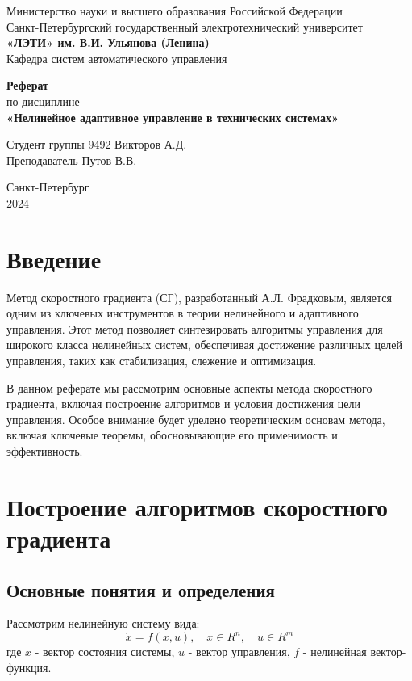 \documentclass[14pt,a4paper]{article}
\begin{document}
\begin{titlepage}
    \begin{center}
        \large
        Министерство науки и высшего образования Российской Федерации \\
        Санкт-Петербургский государственный электротехнический университет \\
        \textbf{«ЛЭТИ» им. В.И. Ульянова (Ленина)} \\
        Кафедра систем автоматического управления

        \vfill

        \textbf{Реферат} \\
        по дисциплине \\
        \textbf{«Нелинейное адаптивное управление в технических системах»}

        \vfill

        Студент группы 9492 \hfill Викторов А.Д. \\
        Преподаватель \hfill Путов В.В.

        \vfill
        Санкт-Петербург \\
        2024
    \end{center}
\end{titlepage}

\tableofcontents

\section{Введение}
Метод скоростного градиента (СГ), разработанный А.Л. Фрадковым, является одним из ключевых инструментов в теории нелинейного и адаптивного управления. Этот метод позволяет синтезировать алгоритмы управления для широкого класса нелинейных систем, обеспечивая достижение различных целей управления, таких как стабилизация, слежение и оптимизация.

В данном реферате мы рассмотрим основные аспекты метода скоростного градиента, включая построение алгоритмов и условия достижения цели управления. Особое внимание будет уделено теоретическим основам метода, включая ключевые теоремы, обосновывающие его применимость и эффективность.

\section{Построение алгоритмов скоростного градиента}

\subsection{Основные понятия и определения}
Рассмотрим нелинейную систему вида:
\begin{equation}
    \dot{x} = f(x,u), \quad x \in R^n, \quad u \in R^m
\end{equation}
где $x$ - вектор состояния системы, $u$ - вектор управления, $f$ - нелинейная вектор-функция.
\end{document}
